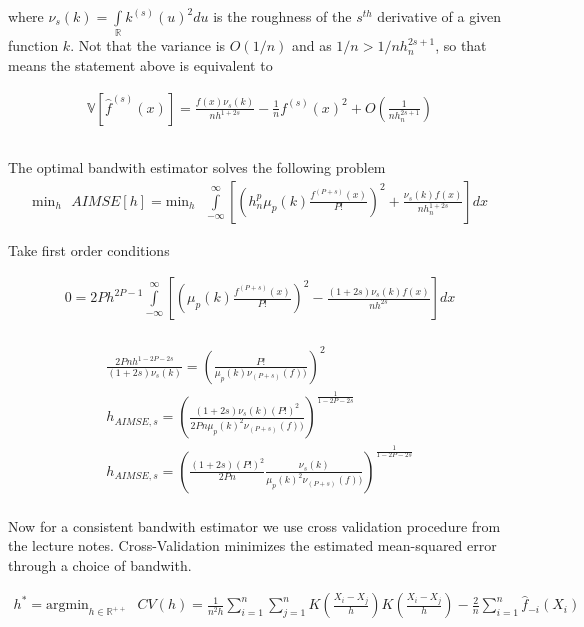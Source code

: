 \documentclass[12pt]{article}
\newcommand{\R}{\mathbb{R}}
\newcommand{\V}{\mathbb{V}}
\begin{document}
where $\nu_s(k) = \int\limits_\R k^{(s)} \left( u \right)^2 du $ is the roughness of the $s^{th}$ derivative of a given function $k$. Not that the variance is $O(1/n)$ and as $1/n>1/nh_n^{2s+1}$, so that means the statement above is equivalent to

\begin{gather*}
\V[\hat{f}^{(s)}(x)] = \frac{f(x) \nu_s(k) }{nh^{1+2s}}- \frac{1}{n}f^{(s)}(x)^2 + O\left(\frac{1}{nh_n^{2s+1}}\right)
\end{gather*}





\subsection{}

The optimal bandwith estimator solves the following problem
\begin{gather*}
\text{min}_h \text{   } AIMSE[h] = \text{min}_h \text{   } \int\limits_{-\infty}^{\infty} \left[ \left( h_n^p \mu_p(k) \frac{f^{(P+s)}(x)}{P!} \right)^2 + \frac{\nu_s(k) f(x)}{nh_n^{1+2s}} \right] dx
\end{gather*}

Take first order conditions

\begin{gather*}
0 =  2P h^{2P-1} \int\limits_{-\infty}^{\infty} \left[ \left( \mu_p(k) \frac{f^{(P+s)}(x)}{P!} \right)^2 - \frac{(1+2s) \nu_s(k) f(x)}{nh^{2s}} \right] dx\\
\end{gather*}


\begin{gather*}
\frac{2Pnh^{1-2P-2s}}{(1+2s) \nu_s(k)} = \left( \frac{P!}{\mu_p(k) \nu_{(P+s)}(f))} \right)^2\\
h_{AIMSE,s} = \left( \frac{ (1+2s) \nu_s(k) (P!)^2     }{ 2Pn \mu_p(k)^2 \nu_{(P+s)}(f))} \right)^{\frac{1}{1-2P-2s}}\\
h_{AIMSE,s} = \left( \frac{(1+2s)  (P!)^2     }{2Pn}     \frac{\nu_s(k)}{  \mu_p(k)^2 \nu_{(P+s)}(f))} \right)^{\frac{1}{1-2P-2s}}\\
\end{gather*}


Now for a consistent bandwith estimator we use cross validation procedure from the lecture notes. Cross-Validation minimizes the estimated mean-squared error through a choice of bandwith.

\begin{gather*}
h^* = \text{argmin}_{h \in \R^{++}} \text{   } CV(h) = \frac{1}{n^2h} \sum\limits_{i=1}^n \sum\limits_{j=1}^n K\left( \frac{X_i - X_j}{h}\right) K\left( \frac{X_i - X_j}{h} \right) - \frac{2}{n} \sum\limits_{i=1}^n \hat{f}_{-i}(X_i)
\end{gather*}
\end{document}
